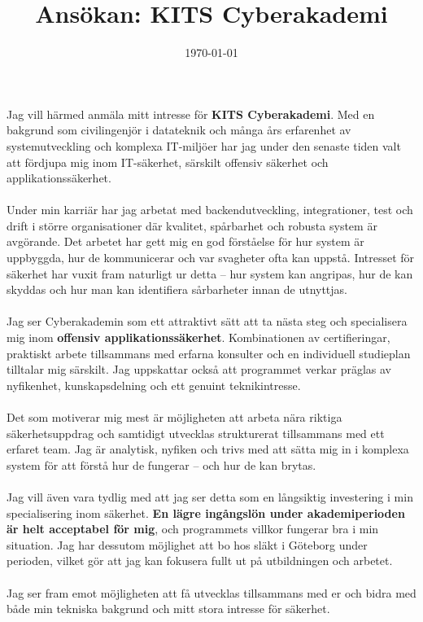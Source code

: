 \documentclass[11pt,a4paper,sans]{moderncv}
\title{Ansökan: KITS Cyberakademi}
\date{\today}
\begin{document}
\makelettertitle

\paragraph{}%
Jag vill härmed anmäla mitt intresse för \textbf{KITS Cyberakademi}. Med en bakgrund som civilingenjör i datateknik och många års erfarenhet av systemutveckling och komplexa IT-miljöer har jag under den senaste tiden valt att fördjupa mig inom IT-säkerhet, särskilt offensiv säkerhet och applikationssäkerhet.

\paragraph{}%
Under min karriär har jag arbetat med backendutveckling, integrationer, test och drift i större organisationer där kvalitet, spårbarhet och robusta system är avgörande. Det arbetet har gett mig en god förståelse för hur system är uppbyggda, hur de kommunicerar och var svagheter ofta kan uppstå. Intresset för säkerhet har vuxit fram naturligt ur detta – hur system kan angripas, hur de kan skyddas och hur man kan identifiera sårbarheter innan de utnyttjas.

\paragraph{}%
Jag ser Cyberakademin som ett attraktivt sätt att ta nästa steg och specialisera mig inom \textbf{offensiv applikationssäkerhet}. Kombinationen av certifieringar, praktiskt arbete tillsammans med erfarna konsulter och en individuell studieplan tilltalar mig särskilt. Jag uppskattar också att programmet verkar präglas av nyfikenhet, kunskapsdelning och ett genuint teknikintresse.

\paragraph{}%
Det som motiverar mig mest är möjligheten att arbeta nära riktiga säkerhetsuppdrag och samtidigt utvecklas strukturerat tillsammans med ett erfaret team. Jag är analytisk, nyfiken och trivs med att sätta mig in i komplexa system för att förstå hur de fungerar – och hur de kan brytas.

\paragraph{}%
Jag vill även vara tydlig med att jag ser detta som en långsiktig investering i min specialisering inom säkerhet. \textbf{En lägre ingångslön under akademiperioden är helt acceptabel för mig}, och programmets villkor fungerar bra i min situation. Jag har dessutom möjlighet att bo hos släkt i Göteborg under perioden, vilket gör att jag kan fokusera fullt ut på utbildningen och arbetet.

\paragraph{}%
Jag ser fram emot möjligheten att få utvecklas tillsammans med er och bidra med både min tekniska bakgrund och mitt stora intresse för säkerhet.

\makeletterclosing
\end{document}
